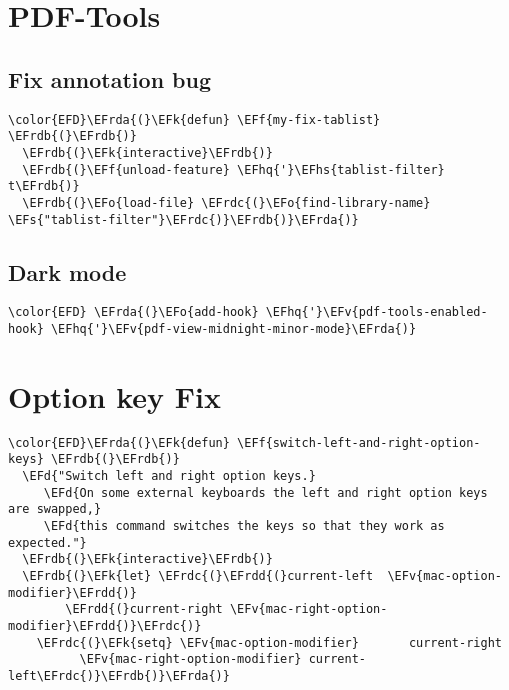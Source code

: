 \documentclass[c]{article}
\theoremstyle{plain}%
\theoremstyle{definition}
\theoremstyle{remark}
\newcommand{\EFs}[1]{\textcolor{EFs}{#1}} %
\newcommand{\EFd}[1]{\textcolor{EFd}{#1}} %
\newcommand{\EFk}[1]{\textcolor{EFk}{#1}} %
\newcommand{\EFf}[1]{\textcolor{EFf}{#1}} %
\newcommand{\EFv}[1]{\textcolor{EFv}{#1}} %
\newcommand{\EFo}[1]{\textcolor{EFo}{#1}} %
\newcommand{\EFhq}[1]{\textcolor{EFhq}{#1}} %
\newcommand{\EFhs}[1]{\textcolor{EFhs}{#1}} %
\newcommand{\EFrda}[1]{\textcolor{EFrda}{#1}} %
\newcommand{\EFrdb}[1]{\textcolor{EFrdb}{#1}} %
\newcommand{\EFrdc}[1]{\textcolor{EFrdc}{#1}} %
\newcommand{\EFrdd}[1]{\textcolor{EFrdd}{#1}} %
\begin{document}
\section{PDF-Tools}
\label{sec:org40e2882}
\subsection{Fix annotation bug}
\label{sec:org3a3d567}
\begin{Code}
\begin{Verbatim}
\color{EFD}\EFrda{(}\EFk{defun} \EFf{my-fix-tablist} \EFrdb{(}\EFrdb{)}
  \EFrdb{(}\EFk{interactive}\EFrdb{)}
  \EFrdb{(}\EFf{unload-feature} \EFhq{'}\EFhs{tablist-filter} t\EFrdb{)}
  \EFrdb{(}\EFo{load-file} \EFrdc{(}\EFo{find-library-name} \EFs{"tablist-filter"}\EFrdc{)}\EFrdb{)}\EFrda{)}
\end{Verbatim}
\end{Code}
\subsection{Dark mode}
\label{sec:orgc8960d5}
\begin{Code}
\begin{Verbatim}
\color{EFD} \EFrda{(}\EFo{add-hook} \EFhq{'}\EFv{pdf-tools-enabled-hook} \EFhq{'}\EFv{pdf-view-midnight-minor-mode}\EFrda{)}
\end{Verbatim}
\end{Code}
\section{Option key Fix}
\label{sec:org1d98f67}
\begin{Code}
\begin{Verbatim}
\color{EFD}\EFrda{(}\EFk{defun} \EFf{switch-left-and-right-option-keys} \EFrdb{(}\EFrdb{)}
  \EFd{"Switch left and right option keys.}
     \EFd{On some external keyboards the left and right option keys are swapped,}
     \EFd{this command switches the keys so that they work as expected."}
  \EFrdb{(}\EFk{interactive}\EFrdb{)}
  \EFrdb{(}\EFk{let} \EFrdc{(}\EFrdd{(}current-left  \EFv{mac-option-modifier}\EFrdd{)}
        \EFrdd{(}current-right \EFv{mac-right-option-modifier}\EFrdd{)}\EFrdc{)}
    \EFrdc{(}\EFk{setq} \EFv{mac-option-modifier}       current-right
          \EFv{mac-right-option-modifier} current-left\EFrdc{)}\EFrdb{)}\EFrda{)}
\end{Verbatim}
\end{Code}
\end{document}

